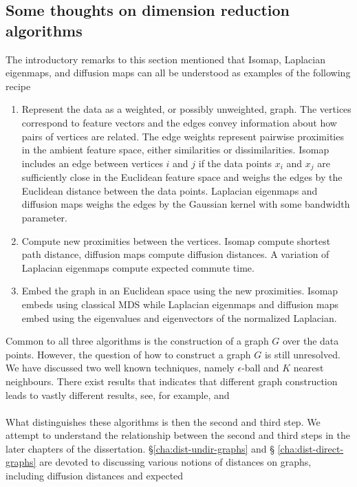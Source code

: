 \subsection{Some thoughts on dimension reduction algorithms}
\label{sec:some-thoughts-isomap}
The introductory remarks to this section mentioned that Isomap,
Laplacian eigenmaps, and diffusion maps can all be understood as
examples of the following recipe
\begin{enumerate}
\item Represent the data as a weighted, or possibly unweighted,
  graph. The vertices correspond to feature vectors and the edges
  convey information about how pairs of vertices are related. The edge
  weights represent pairwise proximities in the ambient feature space,
  either similarities or dissimilarities. Isomap includes an edge
  between vertices $i$ and $j$ if the data points $x_i$ and $x_j$ are
  sufficiently close in the Euclidean feature space and weighs the
  edges by the Euclidean distance between the data points. Laplacian
  eigenmaps and diffusion maps weighs the edges by the Gaussian
  kernel with some bandwidth parameter.
\item Compute new proximities between the vertices. Isomap compute
  shortest path distance, diffusion maps compute diffusion
  distances. A variation of Laplacian eigenmaps compute expected
  commute time.
\item Embed the graph in an Euclidean space using the new
  proximities. Isomap embeds using classical MDS while Laplacian
  eigenmaps and diffusion maps embed using the eigenvalues and
  eigenvectors of the normalized Laplacian. 
\end{enumerate}
Common to all three algorithms is the construction of a graph $G$ over
the data points. However, the question of how to construct a graph $G$
is still unresolved. We have discussed two well known techniques,
namely $\epsilon$-ball and $K$ nearest neighbours. There exist results
that indicates that different graph construction leads to vastly
different results, see, for example,
\citet{maier08:_influen} and \citet{hein07:_conver_laplac} \\ \\
%
%
\noindent
What distinguishes these algorithms is then the second and third
step. We attempt to understand the relationship between the second and
third steps in the later chapters of the dissertation. \S \ref{cha:dist-undir-graphs} and \S
\ref{cha:dist-direct-graphs} are devoted to discussing various notions
of distances on graphs, including diffusion distances and expected
